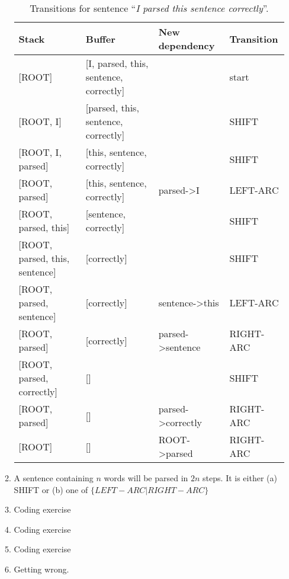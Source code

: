 \documentclass[]{article}
\begin{document}
\begin{enumerate}
\begin{enumerate}
\begin{table}[]
\begin{tabular}{|l|l|l|l|}
\hline
Stack                              & Buffer                                     & New dependency                 & Transition \\ \hline
{[}ROOT{]}                         & {[}I, parsed, this, sentence, correctly{]} &                                & start      \\ \hline
{[}ROOT, I{]}                      & {[}parsed, this, sentence, correctly{]}    &                                & SHIFT      \\ \hline
{[}ROOT, I, parsed{]}              & {[}this, sentence, correctly{]}            &                                & SHIFT      \\ \hline
{[}ROOT, parsed{]}                 & {[}this, sentence, correctly{]}            & parsed-\textgreater{}I         & LEFT-ARC   \\ \hline
{[}ROOT, parsed, this{]}           & {[}sentence, correctly{]}                  &                                & SHIFT      \\ \hline
{[}ROOT, parsed, this, sentence{]} & {[}correctly{]}                            &                                & SHIFT      \\ \hline
{[}ROOT, parsed, sentence{]}       & {[}correctly{]}                            & sentence-\textgreater{}this    & LEFT-ARC   \\ \hline
{[}ROOT, parsed{]}                 & {[}correctly{]}                            & parsed-\textgreater{}sentence  & RIGHT-ARC  \\ \hline
{[}ROOT, parsed, correctly{]}      & {[}{]}                                     &                                & SHIFT      \\ \hline
{[}ROOT, parsed{]}                 & {[}{]}                                     & parsed-\textgreater{}correctly & RIGHT-ARC  \\ \hline
{[}ROOT{]}                         & {[}{]}                                     & ROOT-\textgreater{}parsed      & RIGHT-ARC  \\ \hline
\end{tabular}
\caption{Transitions for sentence \enquote{\textit{I parsed this sentence correctly}}.}
\label{table:sentencetransitions}
\end{table}
	
	
	\item A sentence containing $n$ words will be parsed in $2n$ steps.  
	It is either (a) SHIFT  or (b)  one of $\{LEFT-ARC | RIGHT-ARC\} $
	\item Coding exercise
	\item Coding exercise
	\item Coding exercise
	\item Getting wrong.
	
	\end{enumerate}
	
\end{enumerate}
\end{document}
